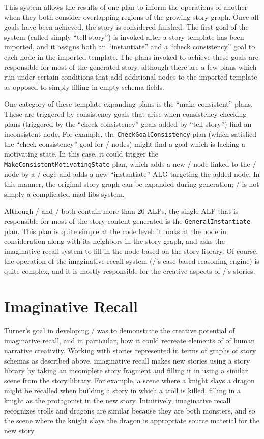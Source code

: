 This system allows the results of one plan to inform the operations of another when they both consider overlapping regions of the growing story graph.
%
Once all goals have been achieved, the story is considered finished.
%
The first goal of the system (called simply ``tell story'') is invoked after a story template has been imported, and it assigns both an ``instantiate'' and a ``check consistency'' goal to each node in the imported template.
%
The plans invoked to achieve these goals are responsible for most of the generated story, although there are a few plans which run under certain conditions that add additional nodes to the imported template as opposed to simply filling in empty schema fields.


One category of these template-expanding plans is the ``make-consistent'' plans.
%
These are triggered by consistency goals that arise when consistency-checking plans (triggered by the ``check consistency'' goals added by ``tell story'') find an inconsistent node.
%
For example, the \texttt{CheckGoalConsistency} plan (which satisfied the ``check consistency'' goal for \gng/ nodes) might find a goal which is lacking a motivating state.
%
In this case, it could trigger the \texttt{MakeConsistentMotivatingState} plan, which adds a new \gns/ node linked to the \gng/ node by a \gem/ edge and adds a new ``instantiate'' ALG targeting the added node.
%
In this manner, the original story graph can be expanded during generation; \minstrel/ is not simply a complicated mad-libs system.


Although \minstrel/ and \skald/ both contain more than 20 ALPs, the single ALP that is responsible for most of the story content generated is the \texttt{GeneralInstantiate} plan.
%
This plan is quite simple at the code level: it looks at the node in consideration along with its neighbors in the story graph, and asks the imaginative recall system to fill in the node based on the story library.
%
Of course, the operation of the imaginative recall system (\minstrel/'s case-based reasoning engine) is quite complex, and it is mostly responsible for the creative aspects of \minstrel/'s stories.


\section{Imaginative Recall}

Turner's goal in developing \minstrel/ was to demonstrate the creative potential of imaginative recall, and in particular, how it could recreate elements of of human narrative creativity.
%
Working with stories represented in terms of graphs of story schemas as described above, imaginative recall makes new stories using a story library by taking an incomplete story fragment and filling it in using a similar scene from the story library.
%
For example, a scene where a knight slays a dragon might be recalled when building a story in which a troll is killed, filling in a knight as the protagonist in the new story.
%
Intuitively, imaginative recall recognizes trolls and dragons are similar because they are both monsters, and so the scene where the knight slays the dragon is appropriate source material for the new story.


